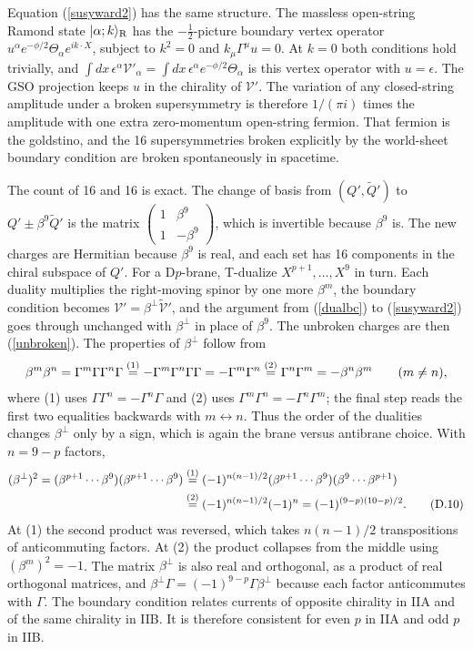 \begin{tcolorbox}[breakable]
\begin{remark}
Equation (\ref{susyward2}) has the same structure. The massless open-string Ramond state $|\alpha;k\rangle_{\rm R}$ has the $-\frac12$-picture boundary vertex operator $u^\alpha e^{-\phi/2}\Theta_\alpha e^{ik\cdot X}$, subject to $k^2 = 0$ and $k_\mu\Gamma^\mu u = 0$. At $k=0$ both conditions hold trivially, and $\int dx\,\epsilon^\alpha\mathcal V'_\alpha = \int dx\,\epsilon^\alpha e^{-\phi/2}\Theta_\alpha$ is this vertex operator with $u = \epsilon$. The GSO projection keeps $u$ in the chirality of $\mathcal V'$. The variation of any closed-string amplitude under a broken supersymmetry is therefore $1/(\pi i)$ times the amplitude with one extra zero-momentum open-string fermion. That fermion is the goldstino, and the 16 supersymmetries broken explicitly by the world-sheet boundary condition are broken spontaneously in spacetime.

The count of 16 and 16 is exact. The change of basis from $(Q',\tilde Q')$ to $Q'\pm\beta^9\tilde Q'$ is the matrix $\begin{pmatrix}1&\beta^9\\1&-\beta^9\end{pmatrix}$, which is invertible because $\beta^9$ is. The new charges are Hermitian because $\beta^9$ is real, and each set has 16 components in the chiral subspace of $Q'$. For a D$p$-brane, T-dualize $X^{p+1},\dots,X^9$ in turn. Each duality multiplies the right-moving spinor by one more $\beta^m$, the boundary condition becomes $\mathcal V' = \beta^\perp\tilde{\mathcal V}'$, and the argument from (\ref{dualbc}) to (\ref{susyward2}) goes through unchanged with $\beta^\perp$ in place of $\beta^9$. The unbroken charges are then (\ref{unbroken}). The properties of $\beta^\perp$ follow from
\begin{align*}
\beta^m\beta^n = \Gamma^m\Gamma\Gamma^n\Gamma \overset{(1)}{=} -\Gamma^m\Gamma^n\Gamma\Gamma = -\Gamma^m\Gamma^n \overset{(2)}{=} \Gamma^n\Gamma^m = -\beta^n\beta^m \qquad (m\ne n),
\end{align*}
where (1) uses $\Gamma\Gamma^n = -\Gamma^n\Gamma$ and (2) uses $\Gamma^m\Gamma^n = -\Gamma^n\Gamma^m$; the final step reads the first two equalities backwards with $m\leftrightarrow n$. Thus the order of the dualities changes $\beta^\perp$ only by a sign, which is again the brane versus antibrane choice. With $n = 9-p$ factors,
\begin{align}
(\beta^\perp)^2 = (\beta^{p+1}\cdots\beta^9)(\beta^{p+1}\cdots\beta^9)
&\overset{(1)}{=} (-1)^{n(n-1)/2}(\beta^{p+1}\cdots\beta^9)(\beta^9\cdots\beta^{p+1}) \notag\\
&\overset{(2)}{=} (-1)^{n(n-1)/2}(-1)^{n} = (-1)^{(9-p)(10-p)/2}. \tag{D.10}\label{bsq}
\end{align}
At (1) the second product was reversed, which takes $n(n-1)/2$ transpositions of anticommuting factors. At (2) the product collapses from the middle using $(\beta^m)^2 = -1$. The matrix $\beta^\perp$ is also real and orthogonal, as a product of real orthogonal matrices, and $\beta^\perp\Gamma = (-1)^{9-p}\Gamma\beta^\perp$ because each factor anticommutes with $\Gamma$. The boundary condition relates currents of opposite chirality in IIA and of the same chirality in IIB. It is therefore consistent for even $p$ in IIA and odd $p$ in IIB.


\end{remark}
\end{tcolorbox}
